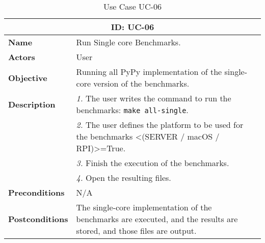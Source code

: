 \begin{table}[H]
    \centering
    \begin{tabular}{l p{10cm}}
        \toprule
        \multicolumn{2}{c}{\textbf{ID: UC-06}} \\
        \toprule
        \textbf{Name}                         &  Run Single core Benchmarks. \\
        \textbf{Actors}                       &  User \\
        \textbf{Objective}                    &  Running all PyPy implementation of the single-core version of the benchmarks. \\
        \multirow{1}{*}{\textbf{Description}} & \textsl{1.} The user writes the command to run the benchmarks: \texttt{make all-single}.\\
                                              & \textsl{2.} The user defines the platform to be used for the benchmarks <(SERVER / macOS / RPI)>=True.\\
                                              & \textsl{3.} Finish the execution of the benchmarks.\\
                                              & \textsl{4.} Open the resulting files.\\
        \textbf{Preconditions}                &  N/A \\
        \textbf{Postconditions}               &  The single-core implementation of the benchmarks are executed, and the results are stored, and those files are output. \\
    \end{tabular}
    \caption{Use Case UC-06}
    \label{tab:uc-06}
\end{table}

